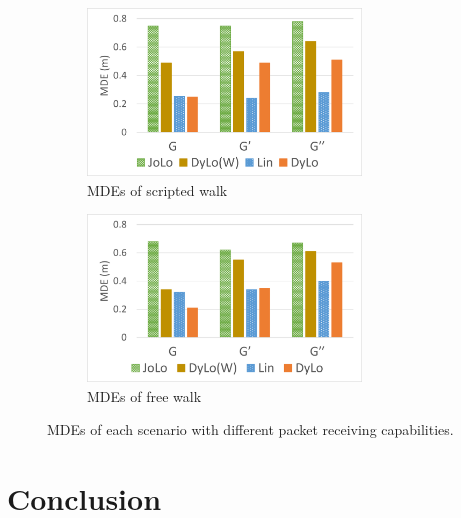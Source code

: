 \documentclass[a4paper,12pt]{report}
\begin{document}
\begin{figure}[tbph]%
    \begin{subfigure}{1\linewidth}
    \centering
        \includegraphics[width=0.8\textwidth]{images/5_8_Device_Heterogeneity_MDE_SW.png}
        \caption{MDEs of scripted walk}
        \label{figure:5_8_Device_Heterogeneity_MDE_SW}
    \end{subfigure}
    \begin{subfigure}{1\linewidth}
    \centering
        \includegraphics[width=0.8\textwidth]{images/5_8_Device_Heterogeneity_MDE_FW.png}
        \caption{MDEs of free walk}
        \label{figure:5_8_Device_Heterogeneity_MDE_FW}
    \end{subfigure}
\caption{MDEs of each scenario with different packet receiving capabilities.}
\label{figure:5_8_Device_Heterogeneity_MDE}
\end{figure}


\chapter{Conclusion}
\end{document}
